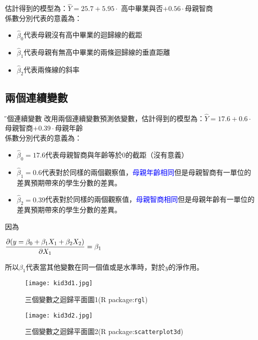 \documentclass[xcolor=dvipsnames]{beamer}
\begin{document}
\begin{frame}
估計得到的模型為：$\hat{Y}=25.7+5.95\cdot$ 高中畢業與否$+0.56\cdot $母親智商\\
係數分別代表的意義為：
\begin{itemize}
\item $\hat{\beta}_{0}$代表母親沒有高中畢業的迴歸線的截距
\item $\hat{\beta}_{1}$代表母親有無高中畢業的兩條迴歸線的垂直距離
\item $\hat{\beta}_{2}$代表兩條線的斜率
\end{itemize}
\end{frame}
\subsection{兩個連續變數}
\begin{frame}{\H 兩個連續變數}
改用兩個連續變數預測依變數，估計得到的模型為：$\hat{Y}=17.6+0.6\cdot $母親智商$+0.39\cdot $母親年齡\\
係數分別代表的意義為：
\begin{itemize}
\item $\hat{\beta}_{0}=17.6$代表母親智商與年齡等於0的截距（沒有意義）
\item $\hat{\beta}_{1}=0.6$代表對於同樣的兩個觀察值，\textcolor{blue}{母親年齡相同}但是母親智商有一單位的差異預期帶來的學生分數的差異。
\item $\hat{\beta}_{2}=0.39$代表對於同樣的兩個觀察值，\textcolor{blue}{母親智商相同}但是母親年齡有一單位的差異預期帶來的學生分數的差異。
\end{itemize}
因為
\begin{center}
$\mathlarger{\frac{\partial (y=\beta_{0}+\beta_{1}X_{1}+\beta_{2}X_{2})}{\partial X_{1}}}=\beta_{1}$
\end{center}
所以$\beta_{1}$代表當其他變數在同一個值或是水準時，對於$y$的淨作用。
\end{frame}
\begin{frame}
\begin{center}
\begin{figure}
\texttt{[image: kid3d1.jpg]}
\caption{三個變數之迴歸平面圖1(R package:{\tt rgl})}
\end{figure}
\end{center}
\end{frame}

\begin{frame}
\begin{center}
\begin{figure}
\texttt{[image: kid3d2.jpg]}
\caption{三個變數之迴歸平面圖2(R package:{\tt {scatterplot3d}})}
\end{figure}
\end{center}
\end{frame}
\end{document}
